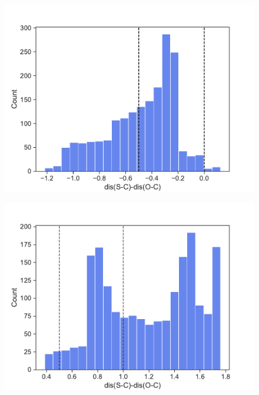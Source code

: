 \documentclass[a4paper,8pt]{beamer}
\begin{document}
%
\begin{frame}
    \begin{figure}[ht]
        \begin{minipage}[b]{0.45\linewidth}
            \centering
            \includegraphics[width=\textwidth]{figures/window5.pdf}
            \label{fig:a}
        \end{minipage}
        \hspace{0.5cm}
        \begin{minipage}[b]{0.45\linewidth}
            \centering
            \includegraphics[width=\textwidth]{figures/window6.pdf}
            \label{fig:b}
        \end{minipage}
    \end{figure}
\end{frame}
%
\end{document}
